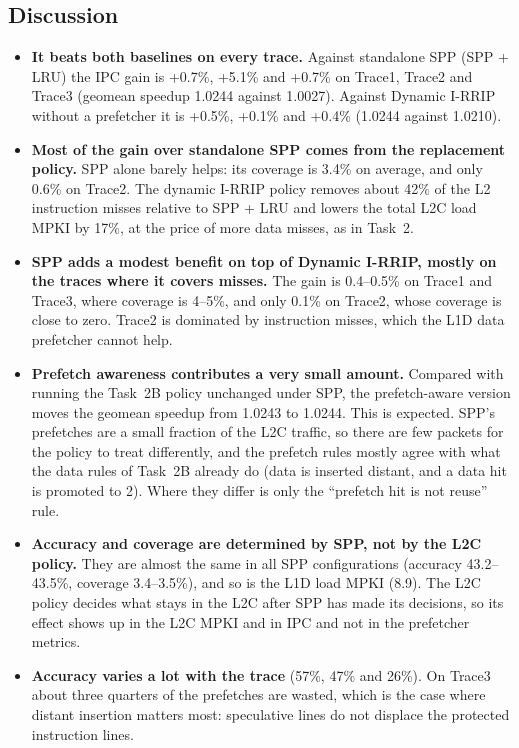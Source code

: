 \documentclass[11pt,a4paper]{article}
\begin{document}
\subsection{Discussion}

\begin{itemize}
    \item \textbf{It beats both baselines on every trace.} Against standalone SPP (SPP + LRU) the IPC gain is
          +0.7\%, +5.1\% and +0.7\% on Trace1, Trace2 and Trace3 (geomean speedup 1.0244 against 1.0027). Against Dynamic I-RRIP without a prefetcher it is
          +0.5\%, +0.1\% and +0.4\% (1.0244 against 1.0210).
    \item \textbf{Most of the gain over standalone SPP comes from the replacement policy.} SPP alone barely helps: its coverage is 3.4\% on average,
          and only 0.6\% on Trace2. The dynamic I-RRIP policy removes about 42\% of the L2 instruction misses relative to SPP + LRU
          and lowers the total L2C load MPKI by 17\%, at the price of more data misses, as in Task~2.
    \item \textbf{SPP adds a modest benefit on top of Dynamic I-RRIP, mostly on the traces where it covers misses.} The gain is
          0.4--0.5\% on Trace1 and Trace3, where coverage is 4--5\%, and only 0.1\% on Trace2, whose coverage is close to zero.
          Trace2 is dominated by instruction misses, which the L1D data prefetcher cannot help.
    \item \textbf{Prefetch awareness contributes a very small amount.} Compared with running the Task~2B policy unchanged under SPP, the prefetch-aware
          version moves the geomean speedup from 1.0243 to 1.0244. This is expected. SPP's prefetches are a small fraction of the L2C traffic, so there
          are few packets for the policy to treat differently, and the prefetch rules mostly agree with what the data rules of Task~2B already do
          (data is inserted distant, and a data hit is promoted to 2). Where they differ is only the ``prefetch hit is not reuse'' rule.
    \item \textbf{Accuracy and coverage are determined by SPP, not by the L2C policy.} They are almost the same in all SPP configurations
          (accuracy 43.2--43.5\%, coverage 3.4--3.5\%), and so is the L1D load MPKI (8.9). The L2C policy decides what stays in the L2C
          after SPP has made its decisions, so its effect shows up in the L2C MPKI and in IPC and not in the prefetcher metrics.
    \item \textbf{Accuracy varies a lot with the trace} (57\%, 47\% and 26\%). On Trace3 about three quarters of the prefetches are wasted, which is the
          case where distant insertion matters most: speculative lines do not displace the protected instruction lines.
\end{itemize}
\end{document}
